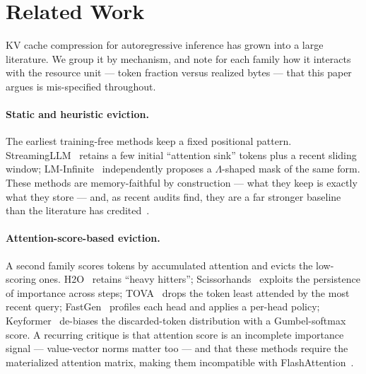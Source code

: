 
\section{Related Work}
\label{sec:related}

KV cache compression for autoregressive inference has grown into a large literature. We group it
by mechanism, and note for each family how it interacts with the resource unit --- token fraction
versus realized bytes --- that this paper argues is mis-specified throughout.

\paragraph{Static and heuristic eviction.}
The earliest training-free methods keep a fixed positional pattern. StreamingLLM~\cite{xiao2024streamingllm}
retains a few initial ``attention sink'' tokens plus a recent sliding window; LM-Infinite~\cite{han2024lminfinite}
independently proposes a $\Lambda$-shaped mask of the same form. These methods are memory-faithful
by construction --- what they keep is exactly what they store --- and, as recent audits find, they
are a far stronger baseline than the literature has credited~\cite{luo2026queryvisibility,garcia2026protection}.

\paragraph{Attention-score-based eviction.}
A second family scores tokens by accumulated attention and evicts the low-scoring ones. H2O~\cite{zhang2023h2o}
retains ``heavy hitters''; Scissorhands~\cite{liu2023scissorhands} exploits the persistence of
importance across steps; TOVA~\cite{oren2024tova} drops the token least attended by the most recent
query; FastGen~\cite{ge2024fastgen} profiles each head and applies a per-head policy; Keyformer~\cite{adnan2024keyformer}
de-biases the discarded-token distribution with a Gumbel-softmax score. A recurring critique is that
attention score is an incomplete importance signal --- value-vector norms matter too --- and that
these methods require the materialized attention matrix, making them incompatible with
FlashAttention~\cite{park2025keydiff}.

